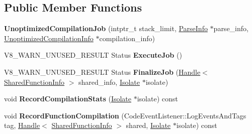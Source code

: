 \subsection*{Public Member Functions}
\begin{DoxyCompactItemize}
\item 
\mbox{\label{classv8_1_1internal_1_1UnoptimizedCompilationJob_abd2d43c7b1815c1ad082e9498b29c5c4}} 
{\bfseries Unoptimized\+Compilation\+Job} (intptr\+\_\+t stack\+\_\+limit, \mbox{\hyperlink{classv8_1_1internal_1_1ParseInfo}{Parse\+Info}} $\ast$parse\+\_\+info, \mbox{\hyperlink{classv8_1_1internal_1_1UnoptimizedCompilationInfo}{Unoptimized\+Compilation\+Info}} $\ast$compilation\+\_\+info)
\item 
\mbox{\label{classv8_1_1internal_1_1UnoptimizedCompilationJob_aea0b51d06ade525965f8a8810eebee4f}} 
V8\+\_\+\+W\+A\+R\+N\+\_\+\+U\+N\+U\+S\+E\+D\+\_\+\+R\+E\+S\+U\+LT Status {\bfseries Execute\+Job} ()
\item 
\mbox{\label{classv8_1_1internal_1_1UnoptimizedCompilationJob_a8c34f61d449c00438df2cd0ca6b918dd}} 
V8\+\_\+\+W\+A\+R\+N\+\_\+\+U\+N\+U\+S\+E\+D\+\_\+\+R\+E\+S\+U\+LT Status {\bfseries Finalize\+Job} (\mbox{\hyperlink{classv8_1_1internal_1_1Handle}{Handle}}$<$ \mbox{\hyperlink{classv8_1_1internal_1_1SharedFunctionInfo}{Shared\+Function\+Info}} $>$ shared\+\_\+info, \mbox{\hyperlink{classv8_1_1internal_1_1Isolate}{Isolate}} $\ast$isolate)
\item 
\mbox{\label{classv8_1_1internal_1_1UnoptimizedCompilationJob_ac32604c62477f5b3f9119f7feaa712e1}} 
void {\bfseries Record\+Compilation\+Stats} (\mbox{\hyperlink{classv8_1_1internal_1_1Isolate}{Isolate}} $\ast$isolate) const
\item 
\mbox{\label{classv8_1_1internal_1_1UnoptimizedCompilationJob_a19f41f07d0036225c436152e585cb3a7}} 
void {\bfseries Record\+Function\+Compilation} (Code\+Event\+Listener\+::\+Log\+Events\+And\+Tags tag, \mbox{\hyperlink{classv8_1_1internal_1_1Handle}{Handle}}$<$ \mbox{\hyperlink{classv8_1_1internal_1_1SharedFunctionInfo}{Shared\+Function\+Info}} $>$ shared, \mbox{\hyperlink{classv8_1_1internal_1_1Isolate}{Isolate}} $\ast$isolate) const

\end{DoxyCompactItemize}
